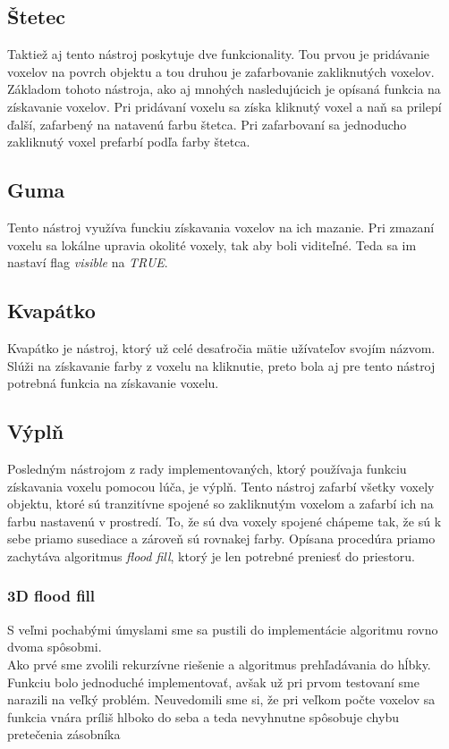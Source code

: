 \subsection{Štetec}
	Taktiež aj tento nástroj poskytuje dve funkcionality. Tou prvou je pridávanie voxelov na povrch objektu a tou druhou je zafarbovanie zakliknutých voxelov.
	Základom tohoto nástroja, ako aj mnohých nasledujúcich je opísaná funkcia na získavanie voxelov.
	Pri pridávaní voxelu sa získa kliknutý voxel a naň sa prilepí ďalší, zafarbený na natavenú farbu štetca. Pri zafarbovaní sa jednoducho zakliknutý voxel prefarbí podľa farby štetca. 
\subsection{Guma}
	Tento nástroj využíva funckiu získavania voxelov na ich mazanie. Pri zmazaní voxelu sa lokálne upravia okolité voxely, tak aby boli viditeľné. Teda sa im nastaví flag \textit{visible} na \textit{TRUE}.
\subsection{Kvapátko}
	Kvapátko je nástroj, ktorý už celé desaťročia mätie užívateľov svojím názvom. Slúži na získavanie farby z voxelu na kliknutie, preto bola aj pre tento nástroj potrebná funkcia na získavanie voxelu. 
\subsection{Výplň}
	Posledným nástrojom z rady implementovaných, ktorý používaja funkciu získavania voxelu pomocou lúča, je výplň. Tento nástroj zafarbí všetky voxely objektu, ktoré sú tranzitívne spojené so zakliknutým voxelom a zafarbí ich na farbu nastavenú v prostredí. To, že sú dva voxely spojené chápeme tak, že sú k sebe priamo susediace a zároveň sú rovnakej farby. Opísana procedúra priamo zachytáva algoritmus \textit{flood fill}, ktorý je len potrebné preniesť do priestoru.
\subsubsection{3D flood fill} 
	S veľmi pochabými úmyslami sme sa pustili do implementácie algoritmu rovno dvoma spôsobmi. \\
	Ako prvé sme zvolili rekurzívne riešenie a algoritmus prehľadávania do hĺbky. Funkciu bolo jednoduché implementovať, avšak už pri prvom testovaní sme narazili na veľký problém. Neuvedomili sme si, že pri veľkom počte voxelov sa funkcia vnára príliš hlboko do seba a teda nevyhnutne spôsobuje chybu pretečenia zásobníka
	
